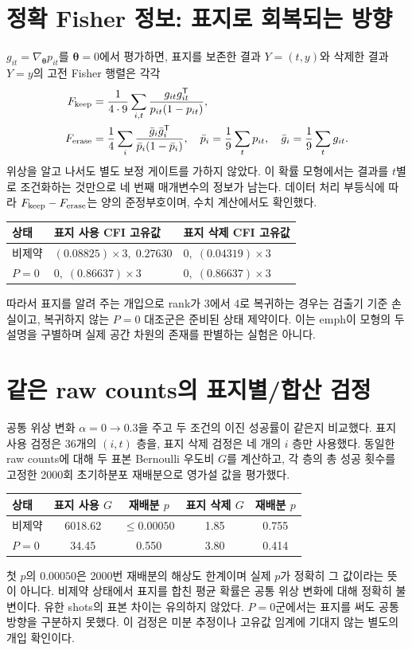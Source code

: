 \documentclass[11pt,a4paper]{article}
\begin{document}
\section{정확 Fisher 정보: 표지로 회복되는 방향}
$g_{it}=\nabla_{\boldsymbol\theta}p_{it}$를 $\boldsymbol\theta=0$에서
평가하면, 표지를 보존한 결과 $Y=(t,y)$와 삭제한 결과 $Y=y$의
고전 Fisher 행렬은 각각
\begin{align}
 F_{\rm keep}
 &=\frac1{4\cdot9}\sum_{i,t}
 \frac{g_{it}g_{it}^{\mathsf T}}{p_{it}(1-p_{it})},\\
 F_{\rm erase}
 &=\frac14\sum_i\frac{\bar g_i\bar g_i^{\mathsf T}}
 {\bar p_i(1-\bar p_i)},
 \quad \bar p_i=\frac19\sum_t p_{it},\quad
 \bar g_i=\frac19\sum_t g_{it}.
\end{align}
위상을 알고 나서도 별도 보정 게이트를 가하지 않았다. 이 확률
모형에서는 결과를 $t$별로 조건화하는 것만으로 네 번째 매개변수의
정보가 남는다. 데이터 처리 부등식에 따라 $F_{\rm keep}-F_{\rm erase}$는
양의 준정부호이며, 수치 계산에서도 확인했다.
\begin{center}
\begin{tabular}{@{}p{42mm}p{48mm}p{48mm}@{}}
\toprule
상태 & 표지 사용 CFI 고유값 & 표지 삭제 CFI 고유값 \\
\midrule
비제약 & $(0.08825)\times3,\;0.27630$ & $0,\;(0.04319)\times3$ \\
$P=0$ & $0,\;(0.86637)\times3$ & $0,\;(0.86637)\times3$ \\
\bottomrule
\end{tabular}
\end{center}
따라서 표지를 알려 주는 개입으로 rank가 3에서 4로 복귀하는
경우는 검출기 기준 손실이고, 복귀하지 않는 $P=0$ 대조군은
준비된 상태 제약이다. 이는 emph{이 모형의 두 설명}을 구별하며
실제 공간 차원의 존재를 판별하는 실험은 아니다.

\section{같은 raw counts의 표지별/합산 검정}
공통 위상 변화 $\alpha=0\to0.3$을 주고 두 조건의 이진 성공률이
같은지 비교했다. 표지 사용 검정은 36개의 $(i,t)$ 층을,
표지 삭제 검정은 네 개의 $i$ 층만 사용했다. 동일한 raw counts에
대해 두 표본 Bernoulli 우도비 $G$를 계산하고, 각 층의 총 성공
횟수를 고정한 2000회 초기하분포 재배분으로 영가설 값을 평가했다.
\begin{center}
\begin{tabular}{@{}lcccc@{}}
\toprule
상태 & 표지 사용 $G$ & 재배분 $p$ & 표지 삭제 $G$ & 재배분 $p$ \\
\midrule
비제약 & 6018.62 & $\le 0.00050$ & 1.85 & 0.755 \\
$P=0$ & 34.45 & 0.550 & 3.80 & 0.414 \\
\bottomrule
\end{tabular}
\end{center}
첫 $p$의 $0.00050$은 2000번 재배분의 해상도 한계이며 실제
$p$가 정확히 그 값이라는 뜻이 아니다. 비제약 상태에서 표지를
합친 평균 확률은 공통 위상 변화에 대해 정확히 불변이다. 유한
shots의 표본 차이는 유의하지 않았다. $P=0$군에서는 표지를 써도
공통 방향을 구분하지 못했다. 이 검정은 미분 추정이나 고유값
임계에 기대지 않는 별도의 개입 확인이다.
\end{document}
